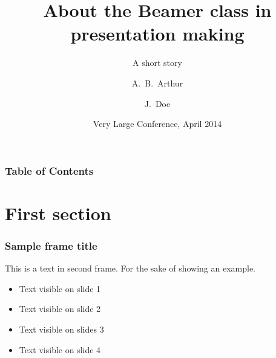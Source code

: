 \documentclass{beamer}
\title[About Beamer] %
{About the Beamer class in presentation making}
\subtitle{A short story}
\author[Arthur, Doe] %
{A.~B.~Arthur\inst{1} \and J.~Doe\inst{2}}
\institute[VFU] %
{
  \inst{1}%
  Faculty of Physics\\
  Very Famous University
  \and
  \inst{2}%
  Faculty of Chemistry\\
  Very Famous University
}
\date[VLC 2014] %
{Very Large Conference, April 2014}
\begin{document}
\frame{\titlepage}


\begin{frame}
\frametitle{Table of Contents}
\tableofcontents
\end{frame}


\section{First section}

\begin{frame}
\frametitle{Sample frame title}
This is a text in second frame. For the sake of showing an example.

\begin{itemize}
    \item<1-> Text visible on slide 1
    \item<2-> Text visible on slide 2
    \item<3> Text visible on slides 3
    \item<4-> Text visible on slide 4
\end{itemize}
\end{frame}

\end{document}

